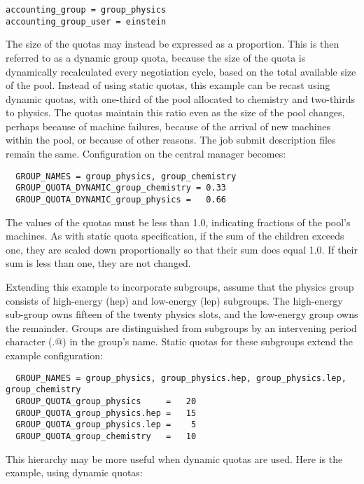 \begin{verbatim}
accounting_group = group_physics
accounting_group_user = einstein
\end{verbatim}

The size of the quotas may instead be expressed as a proportion.
This is then referred to as a dynamic group quota, 
because the size of the quota is dynamically recalculated every
negotiation cycle, 
based on the total available size of the pool.
Instead of using static quotas,
this example can be recast using dynamic quotas, 
with one-third of the pool allocated to chemistry and two-thirds to physics.
The quotas maintain this ratio even as the size of the pool changes,
perhaps because of machine failures, 
because of the arrival of new machines within the pool,
or because of other reasons.  
The job submit description files remain the same. 
Configuration on the central manager becomes:

\begin{verbatim}
  GROUP_NAMES = group_physics, group_chemistry
  GROUP_QUOTA_DYNAMIC_group_chemistry = 0.33
  GROUP_QUOTA_DYNAMIC_group_physics =   0.66
\end{verbatim}

The values of the quotas must be less than 1.0, indicating fractions
of the pool's machines.
As with static quota specification, 
if the sum of the children exceeds one, 
they are scaled down proportionally so that their sum does equal 1.0.
If their sum is less than one, they are not changed.

Extending this example to incorporate subgroups,
assume that the physics group consists of high-energy (hep) 
and low-energy (lep) subgroups.
The high-energy sub-group owns fifteen of the twenty physics slots, 
and the low-energy group owns the remainder.
Groups are distinguished from subgroups by an intervening 
period character (\verb@.@) in the group's name.
Static quotas for these subgroups extend the example configuration:

\footnotesize
\begin{verbatim}
  GROUP_NAMES = group_physics, group_physics.hep, group_physics.lep, group_chemistry
  GROUP_QUOTA_group_physics     =   20
  GROUP_QUOTA_group_physics.hep =   15
  GROUP_QUOTA_group_physics.lep =    5
  GROUP_QUOTA_group_chemistry   =   10
\end{verbatim}
\normalsize

This hierarchy may be more useful when dynamic quotas are used.
Here is the example, using dynamic quotas:

